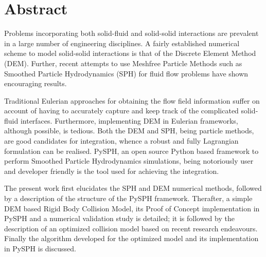 \chapter*{Abstract}

Problems incorporating both solid-fluid and solid-solid interactions are prevalent in a large number of engineering disciplines. A fairly established numerical scheme to model solid-solid interactions is that of the Discrete Element Method (DEM). Further, recent attempts to use Meshfree Particle Methods such as Smoothed Particle Hydrodynamics (SPH) for fluid flow problems have shown encouraging results.

Traditional Eulerian approaches for obtaining the flow field information suffer on account of having to accurately capture and keep track of the complicated solid-fluid interfaces. Furthermore, implementing DEM in Eulerian frameworks, although possible, is tedious. Both the DEM and SPH, being particle methods, are good candidates for integration, whence a robust and fully Lagrangian formulation can be realised. PySPH, an open source Python based framework to perform Smoothed Particle Hydrodynamics simulations, being notoriously user and developer friendly is the tool used for achieving the integration.

The present work first elucidates the SPH and DEM numerical methods, followed by a description of the structure of the PySPH framework. Therafter, a simple DEM based Rigid Body Collision Model, its Proof of Concept implementation in PySPH and a numerical validation study is detailed; it is followed by the description of an optimized collision model based on recent research endeavours. Finally the algorithm developed for the optimized model and its implementation in PySPH is discussed.
